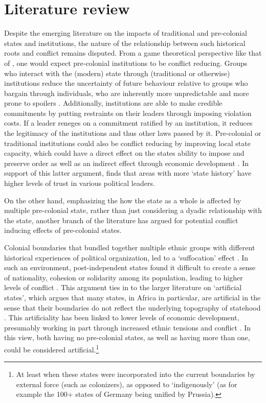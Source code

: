 \documentclass[12pt]{article}
\begin{document}
\section{Literature review} 

Despite the emerging literature on the impacts of traditional and pre-colonial
states and institutions, the nature of the relationship between such historical
roots and conflict remains disputed. From a game theoretical perspective like
that of \citet{Fearon1995}, one would expect pre-colonial institutions to be
conflict reducing. Groups who interact with the (modern) state through
(traditional or otherwise) institutions reduce the uncertainty of future
behaviour relative to groups who bargain through individuals, who are inherently
more unpredictable and more prone to spoilers \citep{Wig2016}. Additionally,
institutions are able to make credible commitments by putting restraints on
their leaders through imposing violation costs. If a leader reneges on a
commitment ratified by an institution, it reduces the legitimacy of the
institutions and thus other laws passed by it. Pre-colonial or traditional
institutions could also be conflict reducing by improving local state capacity,
which could have a direct effect on the states ability to impose and preserve
order as well as an indirect effect through economic development
\citep{Depetris-Chauvin2016}. In support of this latter argument,
\citet{Depetris-Chauvin2016} finds that areas with more `state history' have
higher levels of trust in various political leaders.

On the other hand, emphasizing the how the state as a whole is affected by
multiple pre-colonial state, rather than just considering a dyadic relationship
with the state, another branch of the literature has argued for potential
conflict inducing effects of pre-colonial states.

Colonial boundaries that bundled together multiple ethnic groups with different
historical experiences of political organization, led to a `suffocation' effect
\citep{Englebert2002}. In such an environment, post-independent states found it
difficult to create a sense of nationality, cohesion or solidarity among its
population, leading to higher levels of conflict \citep{Englebert2002}. This
argument ties in to the larger literature on `artificial states', which argues
that many states, in Africa in particular, are artificial in the sense that
their boundaries do not reflect the underlying topography of statehood
\citep{Alesina2011}. This artificiality has been linked to lower levels of
economic development, presumably working in part through increased ethnic
tensions and conflict \citep{Alesina2011}. In this view, both having no
pre-colonial states, as well as having more than one, could be considered
artificial.\footnote{At least when these states were incorporated into the
current boundaries by external force (such as colonizers), as opposed to
`indigenously' (as for example the 100+ states of Germany being unified by
Prussia).} 
\end{document}
